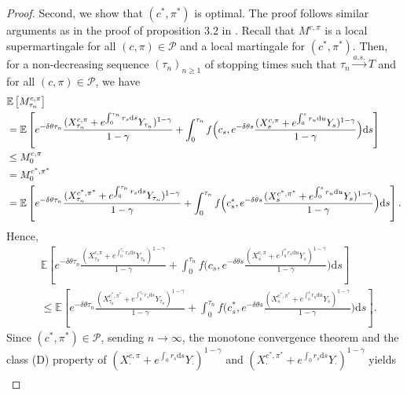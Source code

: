\documentclass[12,reqno]{amsart}
\numberwithin{equation}{section}
\begin{document}
\begin{proof}
	Second, we show that $(c^{*},\pi^{*})$ is optimal. The proof follows similar arguments as in the proof of proposition $3.2$ in \cite{feng2026consumption}. Recall that $M^{c,\pi}$ is a local supermartingale for all $(c,\pi)\in\mathcal{P}$ and a local martingale for $(c^{*},\pi^{*})$. Then, for a non-decreasing sequence $(\tau_{n})_{n\geq1}$ of stopping times such that $\tau_{n}\stackrel{a.s.}\longrightarrow T$ and for all $(c,\pi)\in\mathcal{P}$, we have
	\begin{align*}
		&\mathbb{E}\left[M_{\tau_{n}}^{c,\pi}\right]\notag\\
		&=\mathbb{E}\left[e^{-\delta\theta\tau_{n}}\frac{(X_{\tau_{n}}^{c,\pi}+e^{\int_{0}^{\tau_{n}}r_{s}\mathrm{d}s}Y_{\tau_{n}})^{1-\gamma}}{1-\gamma}+\int_{0}^{\tau_{n}}f\Big(c_{s},e^{-\delta\theta s} \frac{(X_{s}^{c,\pi}+e^{\int_{0}^{s}r_{u}\mathrm{d}u}Y_{s}) ^{1-\gamma}}{1-\gamma}\Big)\mathrm{d}s\right]\\
		&\leq M_{0}^{c,\pi}\notag\\
		&=M_{0}^{c^{*},\pi^{*}}\notag\\
		&=\mathbb{E}\left[e^{-\delta\theta\tau_{n}}\frac{(X_{\tau_{n}}^{c^{*},\pi^{*}}+e^{\int_{0}^{\tau_{n}}r_{s}\mathrm{d}s}Y_{\tau_{n}})^{1-\gamma}}{1-\gamma}+\int_{0}^{\tau_{n}}f\Big(c_{s}^{*},e^{-\delta\theta s} \frac{(X_{s}^{c^{*},\pi^{*}}+e^{\int_{0}^{s}r_{u}\mathrm{d}u}Y_{s})^{1-\gamma}}{1-\gamma}\Big)\mathrm{d}s\right].
	\end{align*}
	Hence,
	\begin{align*}
		&\mathbb{E}\left[e^{-\delta\theta\tau_{n}}\frac{(X_{\tau_{n}}^{c,\pi}+e^{\int_{0}^{\tau_{n}}r_{s}\mathrm{d}s}Y_{\tau_{n}})^{1-\gamma}}{1-\gamma}+\int_{0}^{\tau_{n}}f\Big(c_{s},e^{-\delta\theta s} \frac{(X_{s}^{c,\pi}+e^{\int_{0}^{s}r_{u}\mathrm{d}u}Y_{s}) ^{1-\gamma}}{1-\gamma}\Big)\mathrm{d}s\right]\\
		&\leq\mathbb{E}\left[e^{-\delta\theta\tau_{n}}\frac{(X_{\tau_{n}}^{c^{*},\pi^{*}}+e^{\int_{0}^{\tau_{n}}r_{s}\mathrm{d}s}Y_{\tau_{n}})^{1-\gamma}}{1-\gamma}+\int_{0}^{\tau_{n}}f\Big(c_{s}^{*},e^{-\delta\theta s} \frac{(X_{s}^{c^{*},\pi^{*}}+e^{\int_{0}^{s}r_{u}\mathrm{d}u}Y_{s})^{1-\gamma}}{1-\gamma}\Big)\mathrm{d}s\right].
	\end{align*}
	Since $(c^*,\pi^*)\in\mathcal{P}$, sending $n\to\infty$, the monotone convergence theorem and the class (D) property of $(X_{\cdot}^{c,\pi}+e^{\int_{0}^{\cdot}r_{s}\mathrm{d}s}Y_{\cdot})^{1-\gamma}$ and $(X_{\cdot}^{c^{*},\pi^{*}}+e^{\int_{0}^{\cdot}r_{s}\mathrm{d}s}Y_{\cdot})^{1-\gamma}$ yields
	\begin{align}\label{maxuti}

\end{align}
\end{proof}
\end{document}

